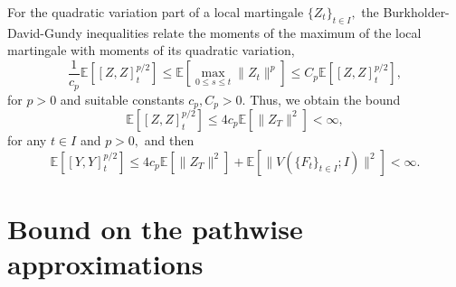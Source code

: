 \documentclass[reqno,12pt]{amsart}
\theoremstyle{plain} %
\theoremstyle{definition} %
\begin{document}
For the quadratic variation part of a local martingale $\{Z_t\}_{t\in I},$ the Burkholder-David-Gundy inequalities \cite[Theorem IV.48]{Protter2005} relate the moments of the maximum of the local martingale with moments of its quadratic variation,
\[
    \frac{1}{c_p}\mathbb{E}\left[[Z, Z]_t^{p/2}\right] \leq \mathbb{E}\left[\max_{0\leq s \leq t} \|Z_t\|^p\right] \leq C_p\mathbb{E}\left[[Z, Z]_t^{p/2}\right],
\]
for $p > 0$ and suitable constants $c_p, C_p > 0.$ Thus, we obtain the bound
\[
    \mathbb{E}\left[[Z, Z]_t^{p/2}\right] \leq 4c_p\mathbb{E}\left[\|Z_T\|^2\right] < \infty,
\]
for any $t\in I$ and $p > 0,$ and then
\[
    \mathbb{E}\left[[Y, Y]_t^{p/2}\right] \leq 4c_p\mathbb{E}\left[\|Z_T\|^2\right] + \mathbb{E}\left[\|V(\{F_t\}_{t\in I}; I)\|^2\right] < \infty.
\]

\section{Bound on the pathwise approximations}
\label{secpathwiseapproximation}
\end{document}
